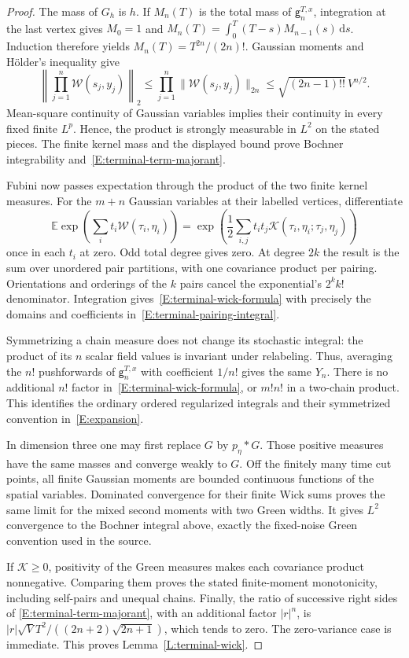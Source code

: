 \documentclass[12pt]{article}
\numberwithin{equation}{section}
\theoremstyle{definition}
\newcommand{\E}{\mathbb{E}}
\newcommand{\ud}{\,\mathrm{d}}
\begin{document}
\begin{proof}
  The mass of $G_h$ is $h$. If $M_n(T)$ is the total mass of
  $\mathsf g_n^{T,x}$, integration at the last vertex gives
  $M_0=1$ and $M_n(T)=\int_0^T(T-s)M_{n-1}(s)\ud s$.
  Induction therefore yields $M_n(T)=T^{2n}/(2n)!$.
  Gaussian moments and H\"older's inequality give
  \[
    \left\|\prod_{j=1}^n\mathcal W(s_j,y_j)\right\|_2
    \le\prod_{j=1}^n\|\mathcal W(s_j,y_j)\|_{2n}
    \le\sqrt{(2n-1)!!}\,V^{n/2}.
  \]
  Mean-square continuity of Gaussian variables implies their continuity
  in every fixed finite $L^p$. Hence, the product is strongly measurable
  in $L^2$ on the stated pieces. The finite kernel mass and the displayed
  bound prove Bochner integrability and~\eqref{E:terminal-term-majorant}.

  Fubini now passes expectation through the product of the two finite
  kernel measures. For the $m+n$ Gaussian variables at their labelled
  vertices, differentiate
  \[
    \E\exp\left(\sum_i t_i\mathcal W(\tau_i,\eta_i)\right)
    =\exp\left(\frac12\sum_{i,j}t_i t_j
    \mathcal K(\tau_i,\eta_i;\tau_j,\eta_j)\right)
  \]
  once in each $t_i$ at zero. Odd total degree gives zero.
  At degree $2k$ the result is the sum over unordered pair partitions,
  with one covariance product per pairing. Orientations and orderings
  of the $k$ pairs cancel the exponential's $2^k k!$ denominator.
  Integration gives~\eqref{E:terminal-wick-formula} with precisely
  the domains and coefficients in~\eqref{E:terminal-pairing-integral}.

  Symmetrizing a chain measure does not change its stochastic integral:
  the product of its $n$ scalar field values is invariant under relabeling.
  Thus, averaging the $n!$ pushforwards of $\mathsf g_n^{T,x}$ with
  coefficient $1/n!$ gives the same $Y_n$. There is no additional $n!$
  factor in~\eqref{E:terminal-wick-formula}, or $m!n!$ in a two-chain
  product. This identifies the ordinary ordered regularized integrals
  and their symmetrized convention in~\eqref{E:expansion}.

  In dimension three one may first replace $G$ by $p_\eta*G$.
  Those positive measures have the same masses and converge weakly to
  $G$. Off the finitely many time cut points, all finite Gaussian moments
  are bounded continuous functions of the spatial variables. Dominated
  convergence for their finite Wick sums proves the same limit for
  the mixed second moments with two Green widths. It gives $L^2$
  convergence to the Bochner integral above, exactly the fixed-noise
  Green convention used in the source.

  If $\mathcal K\ge0$, positivity of the Green measures makes each
  covariance product nonnegative. Comparing them proves the stated
  finite-moment monotonicity, including self-pairs and unequal chains.
  Finally, the ratio of successive right sides of
  \eqref{E:terminal-term-majorant}, with an additional factor $|r|^n$,
  is $|r|\sqrt V T^2/((2n+2)\sqrt{2n+1})$, which tends to zero.
  The zero-variance case is immediate.
  This proves Lemma~\ref{L:terminal-wick}.
\end{proof}
\end{document}
